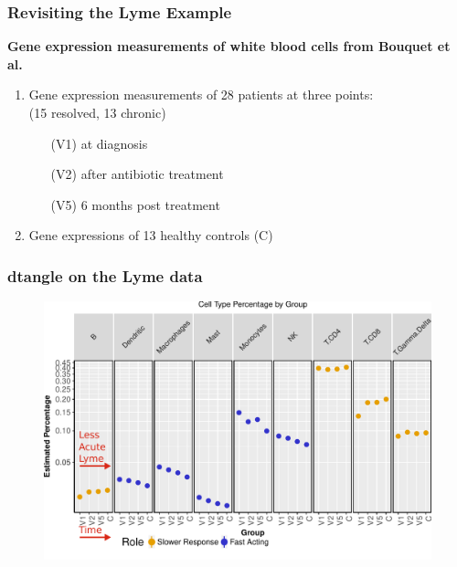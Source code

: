 \documentclass[usenames,dvipsnames,15pt,handout]{beamer}
\newcommand{\cbo}{\color{BurntOrange}}
\begin{document}
\begin{frame}
  \frametitle{Revisiting the Lyme Example}
  {\bf Gene expression measurements of white blood cells from Bouquet et al.}

  \begin{enumerate}
  \item Gene expression measurements of 28 patients at three points:\\
    (15 resolved, 13 chronic) \\
  \begin{enumerate}
  \item[\cbo(V1)] at diagnosis
  \item[\cbo(V2)] after antibiotic treatment
  \item[\cbo(V5)] 6 months post treatment
  \end{enumerate}
  \item Gene expressions of 13 healthy controls {\cbo(C)}
  \end{enumerate}

\end{frame}

\begin{frame}
  \frametitle{dtangle on the Lyme data}
  \vspace*{-.5cm}\begin{figure}
    \hspace*{-.9cm}\includegraphics[scale=.65]{pictures/ctypes.pdf}
  \end{figure}
\end{frame}
\end{document}
